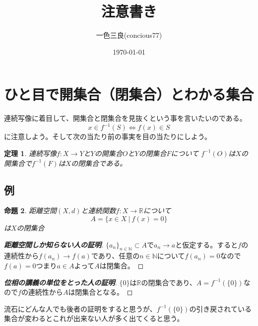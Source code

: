 \documentclass[leqno]{jsarticle}
\title{注意書き}
\author{一色三良(concious77)}
\date{\today}
\newtheorem{thm}{定理}
\newtheorem{prop}[thm]{命題}
\newcommand{\nn}{\mathbb{N}}
\newcommand{\rr}{\mathbb{R}}
\begin{document}
\maketitle
\tableofcontents
\section{ひと目で開集合（閉集合）とわかる集合}

連続写像に着目して、開集合と閉集合を見抜くという事を言いたいのである。
\[
x\in f^{-1}(S)\iff f(x)\in S
\]
に注意しよう。そして次の当たり前の事実を目の当たりにしよう。
\begin{thm}
連続写像$f:X\to Y$と$Y$の開集合$O$と$Y$の閉集合$F$について
$f^{-1}(O)$は$X$の開集合で$f^{-1}(F)$は$X$の閉集合である。
\end{thm}

\subsection{例}
\begin{prop}
距離空間$(X,d)$と連続関数$f:X\to \rr$について
\[
A=\{x\in X\ |\ f(x)=0\}
\]
は$X$の閉集合
\end{prop}
\begin{proof}[{\bf 距離空間しか知らない人の証明}]
$\{a_n\}_{n\in \nn}\subset A$で$a_n\to a$と仮定する。すると$f$の連続性から$f(a_n)\to f(a)$であり、任意の$n\in \nn$について$f(a_n)=0$なので$f(a)=0$つまり$a\in A$よって$A$は閉集合。
\end{proof}
\begin{proof}[{\bf 位相の講義の単位をとった人の証明}]
$\{0\}$は$\rr$の閉集合であり、$A=f^{-1}(\{0\})$なので$f$の連続性から$A$は閉集合となる。
\end{proof}

流石にどんな人でも後者の証明をすると思うが、$f^{-1}(\{0\})$の引き戻されている集合が変わるとこれが出来ない人が多く出てくると思う。
\end{document}
